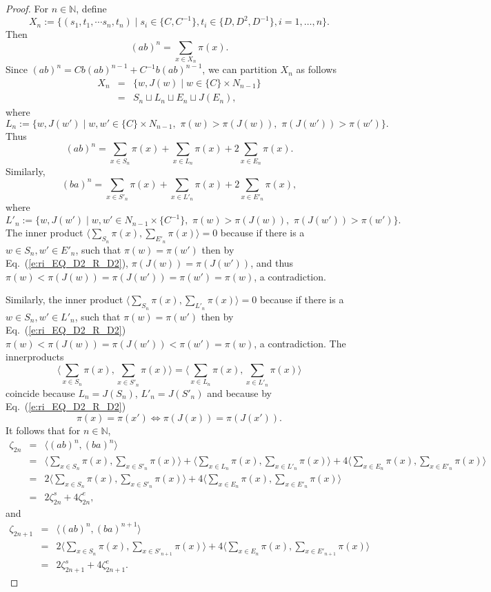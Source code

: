 \documentclass{amsart}
\newcommand{\N}{\mathbb N}
\theoremstyle{definition}
\begin{document}
\begin{proof}
For $n\in\N$, define
$$X_n:=\{(s_1,t_1,\cdots s_n,t_n)\mid s_i\in\{C,C^{-1}\}, t_i\in\{D,D^2,D^{-1}\},i=1,\ldots,n\}.$$
Then
$$(ab)^n=\sum_{x\in X_n}\pi(x).$$
Since $(ab)^n=Cb(ab)^{n-1}+C^{-1}b(ab)^{n-1}$, we can partition $X_n$ as follows
\begin{eqnarray*}
X_n&=&\{w,J(w)\mid w\in \{C\}\times N_{n-1}\}\\ %
 &=&S_n\sqcup L_n\sqcup E_n\sqcup J(E_n), %
\end{eqnarray*}
where 
$$L_n:=\{w, J(w')\mid w,w'\in \{C\}\times N_{n-1},\,\, \pi(w)>\pi(J(w)), \,\,\pi(J(w'))>\pi(w')\}.$$
Thus 
$$(ab)^n=\sum_{x\in S_n} \pi(x)+\sum_{x\in L_n}\pi(x)+2\sum_{x\in E_n} \pi(x).$$
Similarly,
$$(ba)^n=\sum_{x\in S'_n} \pi(x)+\sum_{x\in L'_n}\pi(x)+2\sum_{x\in E'_n} \pi(x),$$
where
$$L'_n:=\{w, J(w')\mid w,w'\in N_{n-1}\times \{C^{-1}\} ,\,\, \pi(w)>\pi(J(w)), \,\,\pi(J(w'))>\pi(w')\}.$$
The inner product  $\langle \sum_{S_n} \pi(x),  \sum_{E'_n}\pi(x)\rangle =0$ because if 
there is a $w\in S_n, w'\in E'_n$,  such that $\pi(w)=\pi(w')$ then by Eq.~(\ref{e:ri_EQ_D2_R_D2}), $\pi(J(w))=\pi(J(w'))$, and thus
$\pi(w)< \pi(J(w))=\pi(J(w'))=\pi(w')=\pi(w)$, a contradiction.

Similarly, the inner product $\langle \sum_{S_n} \pi(x),  \sum_{L'_n}\pi(x)\rangle =0$ because if 
there is a $w\in S_n, w'\in L'_n$,  such that $\pi(w)=\pi(w')$ then by Eq.~(\ref{e:ri_EQ_D2_R_D2})
$\pi(w)< \pi(J(w))=\pi(J(w'))<\pi(w')=\pi(w)$, a contradiction.
The innerproducts
$$\langle \sum_{x\in S_n} \pi(x),\sum_{x\in S'_n} \pi(x)\rangle=
\langle \sum_{x\in L_n}\pi(x),\sum_{x\in L'_n}\pi(x)\rangle$$
coincide because $L_n=J(S_n)$, $L'_n=J(S'_n)$ and because by Eq.~(\ref{e:ri_EQ_D2_R_D2}) 
$$\pi(x)=\pi(x')\iff \pi(J(x))=\pi(J(x')).$$
It follows that for $n\in\N$,
\begin{eqnarray*}
\zeta_{2n}&=&\langle (ab)^n, (ba)^n\rangle\\
&=&\langle \sum_{x\in S_n} \pi(x),\sum_{x\in S'_n} \pi(x)\rangle+
\langle \sum_{x\in L_n}\pi(x),\sum_{x\in L'_n}\pi(x)\rangle+
4\langle \sum_{x\in E_n} \pi(x),\sum_{x\in E'_n} \pi(x)\rangle\\
&=&2\langle \sum_{x\in S_n} \pi(x),\sum_{x\in S'_n} \pi(x)\rangle+
4\langle \sum_{x\in E_n} \pi(x),\sum_{x\in E'_n} \pi(x)\rangle\\
&=&2\zeta_{2n}^s+4 \zeta_{2n}^e,
\end{eqnarray*}
and
\begin{eqnarray*}
\zeta_{2n+1}&=&\langle (ab)^n, (ba)^{n+1}\rangle\\
&=&2\langle \sum_{x\in S_n} \pi(x),\sum_{x\in S'_{n+1}} \pi(x)\rangle+
4\langle \sum_{x\in E_n} \pi(x),\sum_{x\in E'_{n+1}} \pi(x)\rangle\\
&=&2\zeta_{2n+1}^s+4 \zeta_{2n+1}^e.
\end{eqnarray*}
\end{proof}
$ $\\
\end{document}

